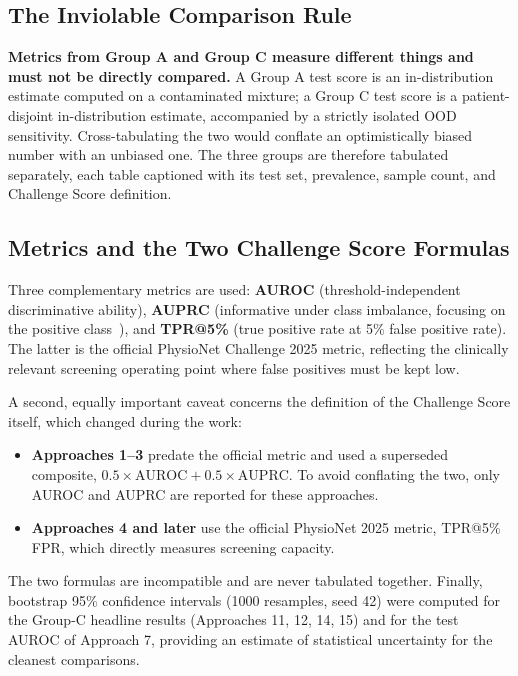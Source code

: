 \subsection{The Inviolable Comparison Rule}

\textbf{Metrics from Group A and Group C measure different things and must not be directly compared.} A Group A test score is an in-distribution estimate computed on a contaminated mixture; a Group C test score is a patient-disjoint in-distribution estimate, accompanied by a strictly isolated OOD sensitivity. Cross-tabulating the two would conflate an optimistically biased number with an unbiased one. The three groups are therefore tabulated separately, each table captioned with its test set, prevalence, sample count, and Challenge Score definition.

\subsection{Metrics and the Two Challenge Score Formulas}

Three complementary metrics are used: \textbf{AUROC} (threshold-independent discriminative ability), \textbf{AUPRC} (informative under class imbalance, focusing on the positive class~\cite{sameni2025geometry}), and \textbf{TPR@5\%} (true positive rate at 5\% false positive rate). The latter is the official PhysioNet Challenge 2025 metric, reflecting the clinically relevant screening operating point where false positives must be kept low.

A second, equally important caveat concerns the definition of the Challenge Score itself, which changed during the work:

\begin{itemize}
    \item \textbf{Approaches 1--3} predate the official metric and used a superseded composite, $0.5 \times \text{AUROC} + 0.5 \times \text{AUPRC}$. To avoid conflating the two, only AUROC and AUPRC are reported for these approaches.
    \item \textbf{Approaches 4 and later} use the official PhysioNet 2025 metric, TPR@5\% FPR, which directly measures screening capacity.
\end{itemize}

The two formulas are incompatible and are never tabulated together. Finally, bootstrap 95\% confidence intervals (1000 resamples, seed 42) were computed for the Group-C headline results (Approaches 11, 12, 14, 15) and for the test AUROC of Approach 7, providing an estimate of statistical uncertainty for the cleanest comparisons.

